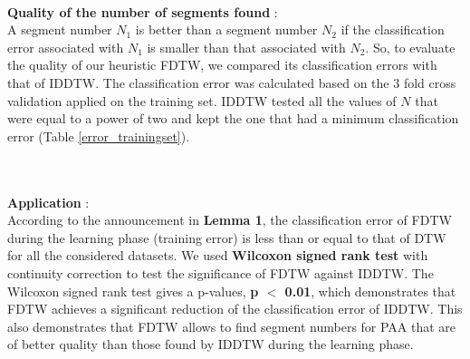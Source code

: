  \paragraph{}\textbf{Quality of the number of segments found} :  \\
 A segment number $N_1$ is better than a segment number $N_2$ if the classification
 error associated with $N_1$ is smaller than that associated with $N_2$. So, to evaluate the
 quality of our heuristic FDTW, we compared its classification errors with that of IDDTW.
  The classification error  was calculated based on the 3 fold cross validation 
  applied on the training set. IDDTW tested all the values of $N$ that were equal to a power of two and kept the one that had  a minimum
classification error (Table \ref{error_trainingset}).


\\
 \paragraph{}\textbf{Application} : \\
According to the announcement in \textbf{Lemma 1}, the classification error of FDTW during the learning phase (training error) is less
than or equal to that of DTW for all the considered datasets.  We used \textbf{Wilcoxon signed rank test} with continuity
correction to test the significance of FDTW against IDDTW.  The Wilcoxon signed rank test gives a
p-values, \textbf{ p $<$ 0.01}, which demonstrates that FDTW achieves a
significant reduction of the classification error of IDDTW. This also demonstrates that FDTW allows
to find segment numbers for PAA that are of better quality than those found by IDDTW during the learning phase.

